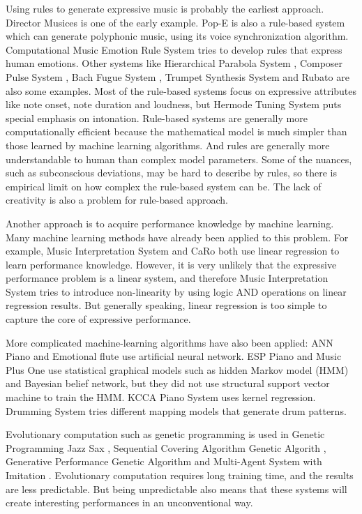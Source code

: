 Using rules to generate expressive music is probably the earliest approach. Director Musices \cite{17} is one of the early example.  Pop-E \cite{28} is also a rule-based system which can generate polyphonic music, using its voice synchronization algorithm. Computational Music Emotion Rule System \cite{31} tries to develop rules that express human emotions. Other systems like Hierarchical Parabola System \cite{17,18,19,20}, Composer Pulse System \cite{21,22}, Bach Fugue System \cite{23}, Trumpet Synthesis System \cite{24, 25} and Rubato \cite{26, 27} are also some examples. Most of the rule-based systems focus on expressive attributes like note onset, note duration and loudness, but Hermode Tuning System \cite{29} puts special emphasis on intonation. Rule-based systems are generally more computationally efficient because the mathematical model is much simpler than those learned by machine learning algorithms. And rules are generally more understandable to human than complex model parameters. Some of the nuances, such as subconscious deviations, may be hard to describe by rules, so there is empirical limit on how complex the rule-based system can be. The lack of creativity is also a problem for rule-based approach.

Another approach is to acquire performance knowledge by machine learning. Many machine learning methods have already been applied to this problem. For example, Music Interpretation System \cite{32,33,34} and CaRo \cite{35,36,37} both use linear regression to learn performance knowledge. However, it is very unlikely that the expressive performance problem is a linear system, and therefore Music Interpretation System tries to introduce non-linearity by using logic AND operations on linear regression results. But generally speaking, linear regression is too simple to capture the core of expressive performance.

More complicated machine-learning algorithms have also been applied: ANN Piano \cite{38} and Emotional flute \cite{39} use artificial neural network. ESP Piano \cite{55} and Music Plus One \cite{52,53,54} use statistical graphical models such as hidden Markov model (HMM) and Bayesian belief network, but they did not use structural support vector machine to train the HMM. KCCA Piano System \cite{57} uses kernel regression. Drumming System \cite{82} tries different mapping models that generate drum patterns.

Evolutionary computation such as genetic programming is used in Genetic Programming Jazz Sax \cite{88}, Sequential Covering Algorithm Genetic Algorith \cite{59}, Generative Performance Genetic Algorithm \cite{89} and Multi-Agent System with Imitation \cite{60, 93}. Evolutionary computation requires long training time, and the results are less predictable. But being unpredictable also means that these systems will create interesting performances in an unconventional way.

